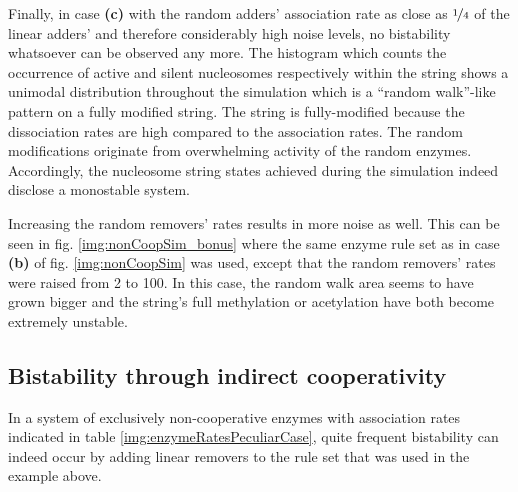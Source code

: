             Finally, in case \textbf{(c)} with the random adders' association rate as close as $\nicefrac{1}{4}$ of the linear adders' and therefore considerably high noise levels, no bistability whatsoever can be observed any more. The histogram which counts the occurrence of active and silent nucleosomes respectively within the string shows a unimodal distribution throughout the simulation which is a “random walk”-like pattern on a fully modified string. The string is fully-modified because the dissociation rates are high compared to the association rates. The random modifications originate from overwhelming activity of the random enzymes. Accordingly, the nucleosome string states achieved during the simulation indeed disclose a monostable system.

            Increasing the random removers' rates results in more noise as well. This can be seen in fig. \ref{img:nonCoopSim_bonus} where the same enzyme rule set as in case \textbf{(b)} of fig. \ref{img:nonCoopSim} was used, except that the random removers' rates were raised from 2 to 100. In this case, the random walk area seems to have grown bigger and the string's full methylation or acetylation have both become extremely unstable.
        \subsection{Bistability through indirect cooperativity}
            \label{subsec:indirectCoop}

            In a system of exclusively non-cooperative enzymes  with association rates indicated in table \ref{img:enzymeRatesPeculiarCase}, quite frequent bistability can indeed occur by adding linear removers to the rule set that was used in the example above.

